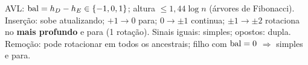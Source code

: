 \begin{chave}
AVL: $\operatorname{bal}=h_D-h_E\in\{-1,0,1\}$; altura $\le1{,}44\log n$ (árvores de Fibonacci). Inserção: sobe atualizando; $+1\to0$ para; $0\to\pm1$ continua; $\pm1\to\pm2$ rotaciona no \textbf{mais profundo} e para (1 rotação). Sinais iguais: simples; opostos: dupla. Remoção: pode rotacionar em todos os ancestrais; filho com $\operatorname{bal}=0$ $\Rightarrow$ simples e para.
\end{chave}
